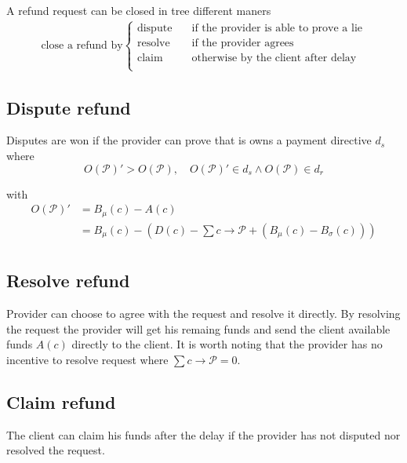 \documentclass{llncs}
\begin{document}
A refund request can be closed in tree different maners
\begin{equation*}
\begin{split}
    \text{close a refund by}
  \begin{cases}
      \text{dispute} & \quad \text{if the provider is able to prove a lie} \\
      \text{resolve} & \quad \text{if the provider agrees} \\
      \text{claim} & \quad \text{otherwise by the client after delay} \\
  \end{cases}
\end{split}
\end{equation*}

\subsection{Dispute refund} Disputes are won if the provider can prove that is owns a payment directive $d_s$ where
$$O(\mathcal{P})' > O(\mathcal{P}), \quad O(\mathcal{P})' \in d_s \land O(\mathcal{P}) \in d_r$$

with
\begin{equation*}
\begin{split}
    O(\mathcal{P})' &= B_\mu(c) - A(c) \\
    &= B_\mu(c) - (D(c) - \textstyle \sum c \rightarrow \mathcal{P} + (B_\mu(c) - B_\sigma(c))) \\
\end{split}
\end{equation*}

\subsection{Resolve refund} Provider can choose to agree with the request and resolve it directly. By resolving the request the provider will get his remaing funds and send the client available funds $A(c)$ directly to the client. It is worth noting that the provider has no incentive to resolve request where $\sum c \rightarrow \mathcal{P} = 0$.

\subsection{Claim refund} The client can claim his funds after the delay if the provider has not disputed nor resolved the request.

\end{document}
